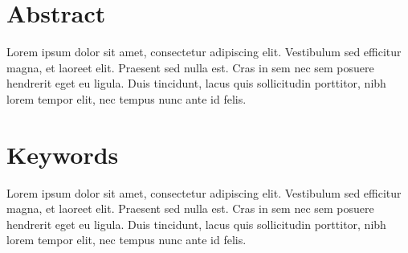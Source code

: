 \thispagestyle{plain}

\section*{Abstract}
\label{sec:abstract}

Lorem ipsum dolor sit amet, consectetur adipiscing elit. Vestibulum sed efficitur magna, et laoreet elit. Praesent sed nulla est. Cras in sem nec sem posuere hendrerit eget eu ligula. Duis tincidunt, lacus quis sollicitudin porttitor, nibh lorem tempor elit, nec tempus nunc ante id felis.

\section*{Keywords}
\label{sec:keywords}

Lorem ipsum dolor sit amet, consectetur adipiscing elit. Vestibulum sed efficitur magna, et laoreet elit. Praesent sed nulla est. Cras in sem nec sem posuere hendrerit eget eu ligula. Duis tincidunt, lacus quis sollicitudin porttitor, nibh lorem tempor elit, nec tempus nunc ante id felis.
